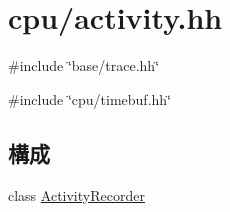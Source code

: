 \hypertarget{activity_8hh}{
\section{cpu/activity.hh}
\label{activity_8hh}
}
{\ttfamily \#include \char`\"{}base/trace.hh\char`\"{}}\par
{\ttfamily \#include \char`\"{}cpu/timebuf.hh\char`\"{}}\par
\subsection*{構成}
\begin{DoxyCompactItemize}
\item 
class \hyperlink{classActivityRecorder}{ActivityRecorder}
\end{DoxyCompactItemize}
